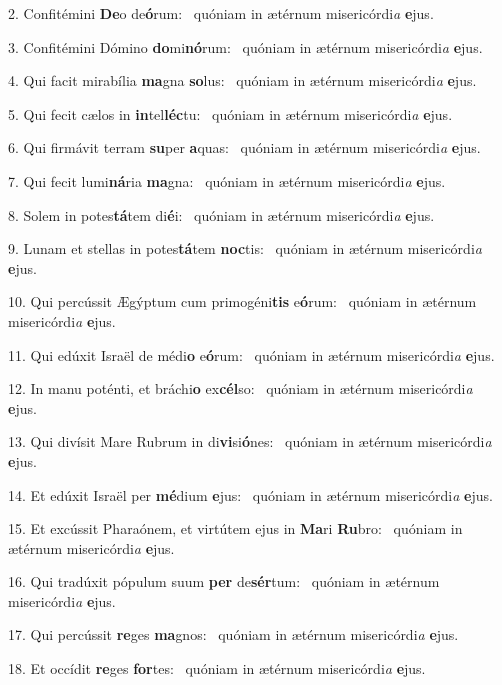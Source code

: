 2. Confitémini \textbf{De}o de\textbf{ó}rum: \ast\  quóniam in ætérnum misericórdi\textit{a} \textbf{e}jus.\

3. Confitémini Dómino \textbf{do}mi\textbf{nó}rum: \ast\  quóniam in ætérnum misericórdi\textit{a} \textbf{e}jus.\

4. Qui facit mirabília \textbf{ma}gna \textbf{so}lus: \ast\  quóniam in ætérnum misericórdi\textit{a} \textbf{e}jus.\

5. Qui fecit cælos in \textbf{in}tel\textbf{léc}tu: \ast\  quóniam in ætérnum misericórdi\textit{a} \textbf{e}jus.\

6. Qui firmávit terram \textbf{su}per \textbf{a}quas: \ast\  quóniam in ætérnum misericórdi\textit{a} \textbf{e}jus.\

7. Qui fecit lumi\textbf{ná}ria \textbf{ma}gna: \ast\  quóniam in ætérnum misericórdi\textit{a} \textbf{e}jus.\

8. Solem in potes\textbf{tá}tem di\textbf{é}i: \ast\  quóniam in ætérnum misericórdi\textit{a} \textbf{e}jus.\

9. Lunam et stellas in potes\textbf{tá}tem \textbf{noc}tis: \ast\  quóniam in ætérnum misericórdi\textit{a} \textbf{e}jus.\

10. Qui percússit Ægýptum cum primogéni\textbf{tis} e\textbf{ó}rum: \ast\  quóniam in ætérnum misericórdi\textit{a} \textbf{e}jus.\

11. Qui edúxit Israël de médi\textbf{o} e\textbf{ó}rum: \ast\  quóniam in ætérnum misericórdi\textit{a} \textbf{e}jus.\

12. In manu poténti, et bráchi\textbf{o} ex\textbf{cél}so: \ast\  quóniam in ætérnum misericórdi\textit{a} \textbf{e}jus.\

13. Qui divísit Mare Rubrum in di\textbf{vi}si\textbf{ó}nes: \ast\  quóniam in ætérnum misericórdi\textit{a} \textbf{e}jus.\

14. Et edúxit Israël per \textbf{mé}dium \textbf{e}jus: \ast\  quóniam in ætérnum misericórdi\textit{a} \textbf{e}jus.\

15. Et excússit Pharaónem, et virtútem ejus in \textbf{Ma}ri \textbf{Ru}bro: \ast\  quóniam in ætérnum misericórdi\textit{a} \textbf{e}jus.\

16. Qui tradúxit pópulum suum \textbf{per} de\textbf{sér}tum: \ast\  quóniam in ætérnum misericórdi\textit{a} \textbf{e}jus.\

17. Qui percússit \textbf{re}ges \textbf{ma}gnos: \ast\  quóniam in ætérnum misericórdi\textit{a} \textbf{e}jus.\

18. Et occídit \textbf{re}ges \textbf{for}tes: \ast\  quóniam in ætérnum misericórdi\textit{a} \textbf{e}jus.\

